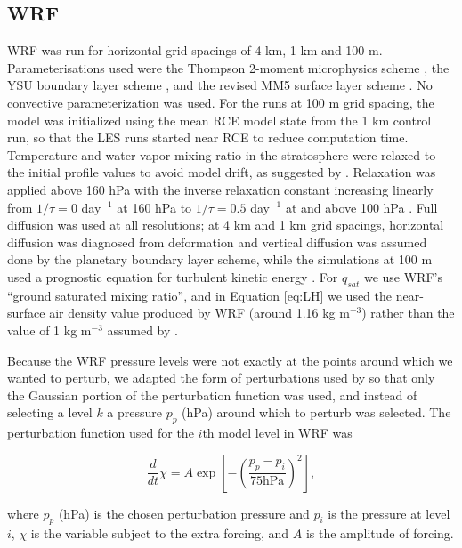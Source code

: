 \documentclass[draft]{agujournal2019}
\begin{document}
\subsection{WRF}

WRF was run for horizontal grid spacings of 4 km, 1 km and 100 m.
Parameterisations used were the Thompson 2-moment microphysics scheme
\cite{Thompson_MWR_2008}, the YSU boundary layer scheme \cite{Hong_MWR_2006},
and the revised MM5 surface layer scheme \cite{Jimenez_MWR_2012}. No convective
parameterization was used. For the runs at 100 m grid spacing, the model was
initialized using the mean RCE model state from the 1 km control run, so that
the LES runs started near RCE to reduce computation time. Temperature and water
vapor mixing ratio in the stratosphere were relaxed to the initial profile
values to avoid model drift, as suggested by .
Relaxation was applied above 160 hPa with the inverse relaxation constant
increasing linearly from $1/\tau = 0$ day$^{-1}$ at 160 hPa to $1/\tau = 0.5$
day$^{-1}$ at and above 100 hPa \cite{Herman_JAMES_2013}. Full diffusion was
used at all resolutions; at 4 km and 1 km grid spacings, horizontal diffusion
was diagnosed from deformation and vertical diffusion was assumed done by the
planetary boundary layer scheme, while the simulations at 100 m used a
prognostic equation for turbulent kinetic energy \cite{Skamarock_2019}. For
$q_{sat}$ we use WRF's ``ground saturated mixing ratio'', and in Equation
\ref{eq:LH} we used the near-surface air density value produced by WRF (around
1.16 kg m$^{-3}$) rather than the value of 1 kg m$^{-3}$ assumed by
. 

Because the WRF pressure levels were not exactly at the points around which we
wanted to perturb, we adapted the form of perturbations used by
 so that only the Gaussian portion of the perturbation
function was used, and instead of selecting a level $k$ a pressure $p_p$ (hPa)
around which to perturb was selected. The perturbation function used for the
$i$th model level in WRF was

\begin{equation}
\frac{d}{dt} \chi = A \exp\left[ - \left( \frac{p_p - p_i}{75 \textrm{hPa}}\right)^2 \right],
\end{equation}

\noindent where $p_p$ (hPa) is the chosen perturbation pressure and $p_i$ is the
pressure at level $i$, $\chi$ is the variable subject to the extra forcing, and
$A$ is the amplitude of forcing.
\end{document}
